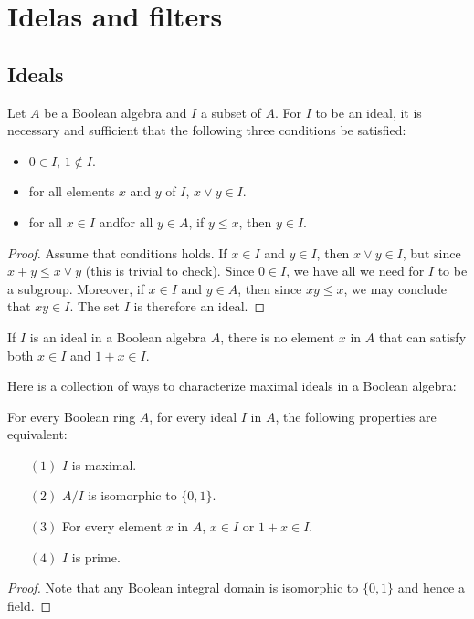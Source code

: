 \section{Idelas and filters}
\subsection{Ideals}
\begin{proposition}
Let $A$ be a Boolean algebra and $I$ a subset of $A$. For $I$ to be an ideal, it is necessary and sufficient that the following three conditions be satisfied:
\begin{itemize}
\item $0\in I$, $1\notin I$.
\item for all elements $x$ and $y$ of $I$, $x\vee y\in I$.
\item for all $x\in I$ andfor all $y\in A$, if $y\leq x$, then $y\in I$.
\end{itemize}
\end{proposition}
\begin{proof}
Assume that conditions holds. If $x\in I$ and $y\in I$, then $x\vee y\in I$, but since $x+y\leq x\vee y$ (this is trivial to check). Since $0\in I$, we have all we need for $I$ to be a subgroup. 
Moreover, if $x\in I$ and $y\in A$, then since $xy\leq x$, we may conclude that $xy\in I$. The set $I$ is therefore an ideal.
\end{proof}
\begin{corollary}
If $I$ is an ideal in a Boolean algebra $A$, there is no element $x$ in $A$ that can satisfy both $x\in I$ and $1+x\in I$.
\end{corollary}
Here is a collection of ways to characterize maximal ideals in a Boolean algebra:
\begin{theorem}\label{Bool ring maximal ideal iff}
For every Boolean ring $A$, for every ideal $I$ in $A$, the following properties are equivalent:
\begin{itemize}
\item[$(1)$] $I$ is maximal.
\item[$(2)$] $A/I$ is isomorphic to $\{0,1\}$.
\item[$(3)$] For every element $x$ in $A$, $x\in I$ or $1+x\in I$.
\item[$(4)$] $I$ is prime.
\end{itemize}
\end{theorem}
\begin{proof}
Note that any Boolean integral domain is isomorphic to $\{0,1\}$ and hence a field.
\end{proof}
